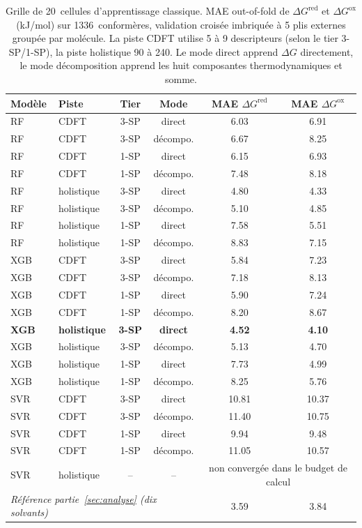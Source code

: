 \begin{table}[H]
\centering
\caption{Grille de 20~cellules d'apprentissage classique. MAE out-of-fold de $\Delta G^\text{red}$ et $\Delta G^\text{ox}$ (kJ/mol) sur 1336~conformères, validation croisée imbriquée à 5 plis externes groupée par molécule. La piste CDFT utilise 5 à 9 descripteurs (selon le tier 3-SP/1-SP), la piste holistique 90 à 240. Le mode direct apprend $\Delta G$ directement, le mode décomposition apprend les huit composantes thermodynamiques et somme.}
\label{tab:ml_classique_grille}
\footnotesize
\begin{tabular}{l l c c c c}
\toprule
\textbf{Modèle} & \textbf{Piste} & \textbf{Tier} & \textbf{Mode} & \textbf{MAE $\Delta G^\text{red}$} & \textbf{MAE $\Delta G^\text{ox}$} \\
\midrule
RF  & CDFT       & 3-SP & direct      & 6.03 & 6.91 \\
RF  & CDFT       & 3-SP & décompo.    & 6.67 & 8.25 \\
RF  & CDFT       & 1-SP & direct      & 6.15 & 6.93 \\
RF  & CDFT       & 1-SP & décompo.    & 7.48 & 8.18 \\
RF  & holistique & 3-SP & direct      & 4.80 & 4.33 \\
RF  & holistique & 3-SP & décompo.    & 5.10 & 4.85 \\
RF  & holistique & 1-SP & direct      & 7.58 & 5.51 \\
RF  & holistique & 1-SP & décompo.    & 8.83 & 7.15 \\
XGB & CDFT       & 3-SP & direct      & 5.84 & 7.23 \\
XGB & CDFT       & 3-SP & décompo.    & 7.18 & 8.13 \\
XGB & CDFT       & 1-SP & direct      & 5.90 & 7.24 \\
XGB & CDFT       & 1-SP & décompo.    & 8.20 & 8.67 \\
\textbf{XGB} & \textbf{holistique} & \textbf{3-SP} & \textbf{direct} & \textbf{4.52} & \textbf{4.10} \\
XGB & holistique & 3-SP & décompo.    & 5.13 & 4.70 \\
XGB & holistique & 1-SP & direct      & 7.73 & 4.99 \\
XGB & holistique & 1-SP & décompo.    & 8.25 & 5.76 \\
SVR & CDFT       & 3-SP & direct      & 10.81 & 10.37 \\
SVR & CDFT       & 3-SP & décompo.    & 11.40 & 10.75 \\
SVR & CDFT       & 1-SP & direct      &  9.94 &  9.48 \\
SVR & CDFT       & 1-SP & décompo.    & 11.05 & 10.57 \\
SVR & holistique & --   & --          & \multicolumn{2}{c}{non convergée dans le budget de calcul} \\
\midrule
\multicolumn{4}{l}{\emph{Référence partie~\ref{sec:analyse} (dix solvants)}} & 3.59 & 3.84 \\
\bottomrule
\end{tabular}
\end{table}

